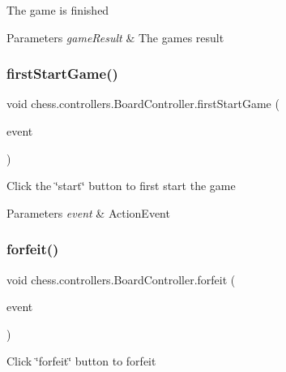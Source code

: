 The game is finished


\begin{DoxyParams}{Parameters}
{\em game\+Result} & The game\textquotesingle{}s result \\
\hline
\end{DoxyParams}
\mbox{\label{classchess_1_1controllers_1_1_board_controller_a655a4185aa49e122521d08dc5b658844}} 
\subsubsection{\texorpdfstring{first\+Start\+Game()}{firstStartGame()}}
{\footnotesize\ttfamily void chess.\+controllers.\+Board\+Controller.\+first\+Start\+Game (\begin{DoxyParamCaption}\item[{Action\+Event}]{event }\end{DoxyParamCaption})}

Click the \char`\"{}start\char`\"{} button to first start the game


\begin{DoxyParams}{Parameters}
{\em event} & Action\+Event \\
\hline
\end{DoxyParams}
\mbox{\label{classchess_1_1controllers_1_1_board_controller_a7d0d4bce0ebb4a04cc36efa8ec32ef69}} 
\subsubsection{\texorpdfstring{forfeit()}{forfeit()}}
{\footnotesize\ttfamily void chess.\+controllers.\+Board\+Controller.\+forfeit (\begin{DoxyParamCaption}\item[{Action\+Event}]{event }\end{DoxyParamCaption})}

Click \char`\"{}forfeit\char`\"{} button to forfeit


